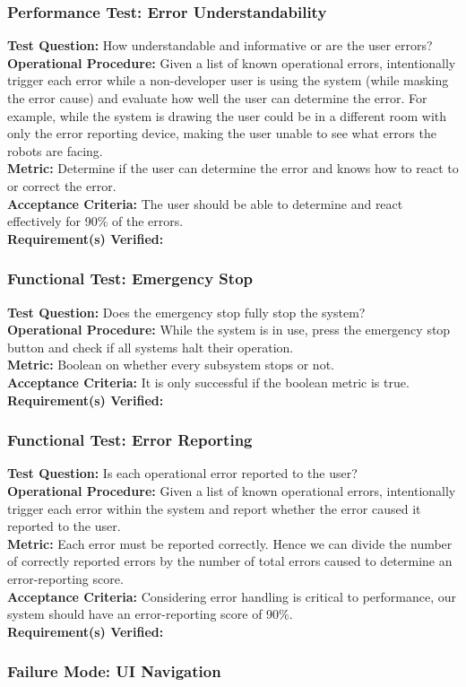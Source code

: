 \subsubsection{Performance Test: Error Understandability}
\label{sec:ui_pt_error_understand}
\textbf{Test Question:} How understandable and informative or are the user errors?\\
\textbf{Operational Procedure:} Given a list of known operational errors, intentionally trigger each error while a non-developer user is using the system (while masking the error cause) and evaluate how well the user can determine the error. For example, while the system is drawing the user could be in a different room with only the error reporting device, making the user unable to see what errors the robots are facing.\\
\textbf{Metric:}  Determine if the user can determine the error and knows how to react to or correct the error. \\
\textbf{Acceptance Criteria:}  The user should be able to determine and react effectively for 90\% of the errors.\\
\textbf{Requirement(s) Verified:} 

\subsubsection{Functional Test: Emergency Stop}
\label{sec:ui_ft_emergency_stop}
\textbf{Test Question:} Does the emergency stop fully stop the system? \\
\textbf{Operational Procedure:} While the system is in use, press the emergency stop button and check if all systems halt their operation. \\
\textbf{Metric:} Boolean on whether every subsystem stops or not. \\
\textbf{Acceptance Criteria:} It is only successful if the boolean metric is true. \\
\textbf{Requirement(s) Verified:}  

\subsubsection{Functional Test: Error Reporting}
\label{sec:ui_ft_error_reporting}
\textbf{Test Question:} Is each operational error reported to the user? \\
\textbf{Operational Procedure:} Given a list of known operational errors, intentionally trigger each error within the system and report whether the error caused it reported to the user. \\
\textbf{Metric:} Each error must be reported correctly. Hence we can divide the number of correctly reported errors by the number of total errors caused to determine an error-reporting score.  \\
\textbf{Acceptance Criteria:} Considering error handling is critical to performance, our system should have an error-reporting score of 90\%. \\
\textbf{Requirement(s) Verified:}  

\subsubsection{Failure Mode: UI Navigation}
\label{sec:ui_fm_navigation}
